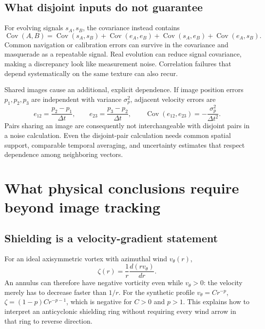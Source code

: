 \documentclass[11pt]{article}
\newcommand{\Cov}{\operatorname{Cov}}
\begin{document}
\subsection{What disjoint inputs do not guarantee}

For evolving signals $s_A,s_B$, the covariance instead contains
\begin{equation}
 \Cov(A,B)=\Cov(s_A,s_B)+\Cov(e_A,e_B)
 +\Cov(s_A,e_B)+\Cov(e_A,s_B).
\end{equation}
Common navigation or calibration errors can survive in the covariance and
masquerade as a repeatable signal. Real evolution can reduce signal
covariance, making a discrepancy look like measurement noise. Correlation
failures that depend systematically on the same texture can also recur.

Shared images cause an additional, explicit dependence. If image position
errors $p_1,p_2,p_3$ are independent with variance $\sigma_p^2$, adjacent
velocity errors are
\begin{equation}
 e_{12}=\frac{p_2-p_1}{\Delta t},\qquad
 e_{23}=\frac{p_3-p_2}{\Delta t},\qquad
 \Cov(e_{12},e_{23})=-\frac{\sigma_p^2}{\Delta t^2}.
\end{equation}
Pairs sharing an image are consequently not interchangeable with disjoint
pairs in a noise calculation. Even the disjoint-pair calculation needs common
spatial support, comparable temporal averaging, and uncertainty estimates
that respect dependence among neighboring vectors.

\section{What physical conclusions require beyond image tracking}

\subsection{Shielding is a velocity-gradient statement}

For an ideal axisymmetric vortex with azimuthal wind $v_\theta(r)$,
\begin{equation}
 \zeta(r)=\frac{1}{r}\frac{d(rv_\theta)}{dr}.
\end{equation}
An annulus can therefore have negative vorticity even while
$v_\theta>0$: the velocity merely has to decrease faster than $1/r$.
For the synthetic profile $v_\theta=Cr^{-p}$,
$\zeta=(1-p)Cr^{-p-1}$, which is negative for $C>0$ and $p>1$.
This explains how to interpret an anticyclonic shielding ring without
requiring every wind arrow in that ring to reverse direction.
\end{document}
